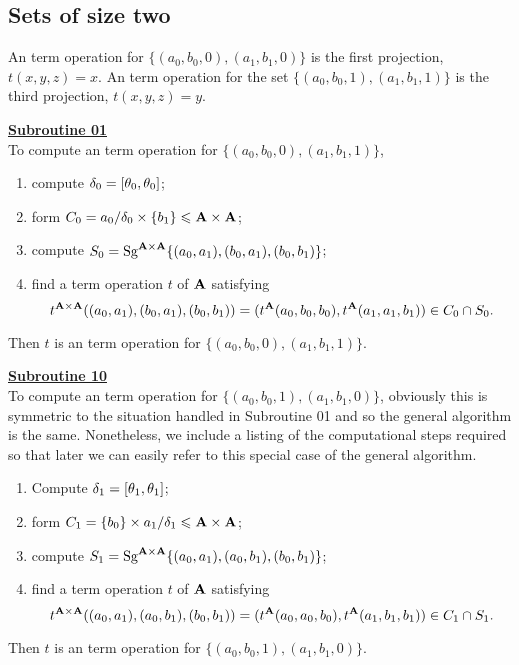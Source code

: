 \subsection{Sets of size two}
An \ld term operation for 
$\{(a_0,b_0,0), (a_1, b_1, 0)\}$ is the first projection,
$t(x,y,z) = x$.
An \ld term operation for the set
$\{(a_0,b_0,1), (a_1, b_1, 1)\}$ is the third projection,
$t(x,y,z) = y$.


\smallskip
\noindent \underline{\textbf{Subroutine 01}}\\[4pt]
To compute an \ld term operation for $\{(a_0,b_0,0), (a_1, b_1, 1)\}$,
\begin{enumerate}
\item compute $\delta_0=[\theta_0, \theta_0]$;
\item form $C_0= a_0/\delta_0 \times \{b_1\} \leqslant \mathbf{A}\times\mathbf{A}$;
\item compute
      $S_0=\operatorname{Sg}^{\mathbf{A}\times \mathbf{A}} \{(a_0,a_1),(b_0,a_1),(b_0,b_1)\}$;
\item find a term operation $t$ of $\mathbf{A}$ satisfying
\[t^{\mathbf{A}\times\mathbf{A}}((a_0,a_1),(b_0,a_1),(b_0,b_1)) =
 (t^{\mathbf{A}}(a_0,b_0,b_0), t^{\mathbf{A}}(a_1,a_1,b_1)) \in C_0 \cap S_0.\]
\end{enumerate}
Then $t$ is an \ld term operation for
$\{(a_0, b_0, 0), (a_1, b_1, 1)\}$.

\medskip

\noindent \underline{\textbf{Subroutine 10}}\\[4pt]
To compute an \ld term operation for
$\{(a_0,b_0,1), (a_1, b_1, 0)\}$, obviously this is symmetric to
the situation handled in Subroutine 01 and so the general algorithm
is the same.  Nonetheless, we include a listing of the computational 
steps required so that later we can easily refer to this special case 
of the general algorithm.
\begin{enumerate}
\item Compute $\delta_1=[\theta_1, \theta_1]$;
\item form $C_1= \{b_0\}\times a_1/\delta_1 \leqslant \mathbf{A}\times\mathbf{A}$;
\item compute
      $S_1=\operatorname{Sg}^{\mathbf{A}\times \mathbf{A}} \{(a_0,a_1),(a_0,b_1),(b_0,b_1)\}$;
\item find a term operation $t$ of $\mathbf{A}$ satisfying
\[t^{\mathbf{A}\times\mathbf{A}}((a_0,a_1),(a_0,b_1),(b_0,b_1)) =
 (t^{\mathbf{A}}(a_0,a_0,b_0), t^{\mathbf{A}}(a_1,b_1,b_1)) \in C_1 \cap S_1.\]
\end{enumerate}
Then $t$ is an \ld term operation for
$\{(a_0, b_0, 1), (a_1, b_1, 0)\}$.

